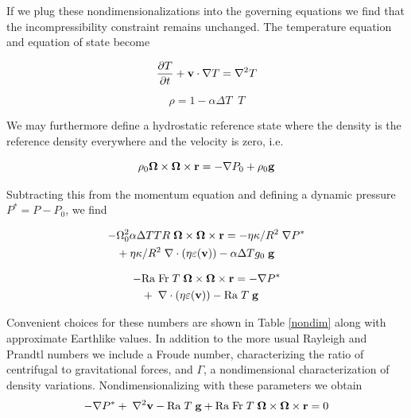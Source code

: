 \documentclass[extra,onecolumn]{gji}
\begin{document}
If we plug these nondimensionalizations into the governing equations we find that the incompressibility constraint remains unchanged.  The temperature equation and equation of state become

\begin{equation}
\frac{\partial T}{\partial t} + {\bf v} \cdot \nabla T = \nabla^2 T
\end{equation}

\begin{equation}
\rho = 1 - \alpha \Delta T \;\;  T
\end{equation}

We may furthermore define a hydrostatic reference state where the density is the reference density everywhere and the velocity is zero, i.e.

\begin{equation}
 \rho_0{\bf \Omega \times \Omega \times r}= - \nabla P_0 + \rho_0 {\bf g}
\end{equation}

Subtracting this from the momentum equation and defining a dynamic pressure $P^* = P - P_0$, we find

\begin{equation}
\begin{aligned}
 - & \Omega_0^2  \alpha  \Delta T T R \; {\bf \Omega \times \Omega \times r} = - \eta \kappa / R^2 \; \nabla P^* \\ 
&+ \eta \kappa / R^2 \; \nabla \cdot \left( \eta \varepsilon ({\bf v}) \right) - \alpha \Delta T g_0 \; {\bf g}
\end{aligned}
\end{equation}

\begin{equation}
\begin{aligned}
 - & \mathrm{Ra \; Fr}\; T \; {\bf \Omega \times \Omega \times r} = - \nabla P^* \\ 
&+ \; \nabla \cdot \left( \eta \varepsilon ({\bf v}) \right) - \mathrm{Ra} \; T \; {\bf g}
\end{aligned}
\end{equation}

  
\fi


Convenient choices for these numbers are shown in Table \ref{nondim} along with approximate Earthlike values.
In addition to the more usual Rayleigh and Prandtl numbers we include a Froude number, characterizing the ratio of centrifugal to gravitational forces, and $\Gamma$, a nondimensional characterization of density variations.
Nondimensionalizing with these parameters we obtain
\begin{equation}
\begin{aligned}
 - \nabla P^* + \; \nabla^2{\bf v} - \mathrm{Ra} \; T \; {\bf g} + \mathrm{Ra \; Fr}\; T \;{\bf \Omega \times \Omega \times r} = 0
\end{aligned}
\end{equation}
\end{document}
